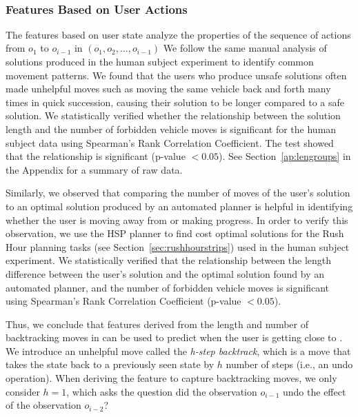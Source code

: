 ~\subsubsection{Features Based on User Actions}
The features based on user state analyze the properties of the sequence of actions from $o_1$ to $o_{i-1}$ in \historyDef $( o_1, o_2, \ldots, o_{i-1} )$
We follow the same manual analysis of solutions produced in the human subject experiment to identify common movement patterns. 
We found that the users who produce unsafe solutions often made unhelpful moves such as moving the same vehicle back and forth many times in quick succession, causing their solution to be longer compared to a safe solution. 
We statistically verified whether the relationship between the solution length and the number of forbidden vehicle moves is significant for the human subject data using Spearman's Rank Correlation Coefficient. 
The test showed that the relationship is significant (p-value $<0.05$). 
See Section~\ref{ap:lengroups} in the Appendix for a summary of raw data.

Similarly, we observed that comparing the number of moves of the user's solution to an optimal solution produced by an automated planner is helpful in identifying whether the user is moving away from \desired or making progress. 
In order to verify this observation, we use the HSP planner \cite{bonet01planningas} to find cost optimal solutions for the Rush Hour planning tasks (see Section~\ref{sec:rushhourstrips}) used in the human subject experiment.
We statistically verified that the relationship between the length difference between the user's solution and the optimal solution found by an automated planner, and the number of forbidden vehicle moves is significant using Spearman's Rank Correlation Coefficient (p-value $<0.05$).

Thus, we conclude that features derived from the length and number of backtracking moves in \historyDef can be used to predict when the user is getting close to \undesired. 
We introduce an unhelpful move called the \textit{h-step backtrack}, which is a move that takes the  state back to a previously seen state by $h$ number of steps (i.e., an undo operation).
When deriving the feature to capture backtracking moves, we only consider $h=1$, which asks the question did the observation $o_{i-1}$ undo the effect of the observation $o_{i-2}$?


